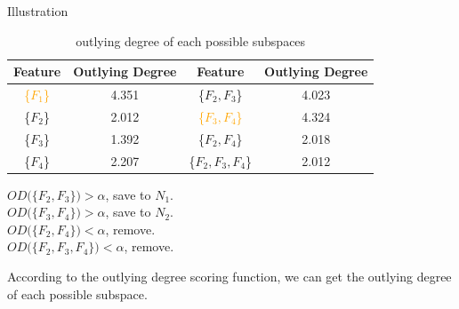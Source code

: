 \documentclass[
 size=14pt,
 paper=smartboard,  %
 mode=present, 		%
 display=slides, 	%
 style=tuliplab,  	%
 pauseslide,
 fleqn,leqno]{powerdot}
\begin{document}
\begin{slide}[toc=,bm=]{Illustration}

\setlength{\abovecaptionskip}{0pt}
\setlength{\belowcaptionskip}{10pt}
\centering
\begin{table}
\caption{outlying degree of each possible subspaces}

\begin{tabular}{c|c|c|c}
  \toprule
  Feature & Outlying Degree & Feature & Outlying Degree \\
  \midrule
  \textcolor{orange}{\{$F_1$\}}  & 4.351  & \{$F_2, F_3$\}  & 4.023 \\
  \{$F_2$\}  & 2.012                      & \textcolor{orange}{\{$F_3, F_4$\}} & 4.324 \\
  \{$F_3$\}  & 1.392                      & \{$F_2, F_4$\} & 2.018 \\
  \{$F_4$\}  & 2.207                      & \{$F_2, F_3, F_4$\} & 2.012 \\
  \bottomrule
\end{tabular}
\end{table}

\bigskip

{
\vspace{.75cm}
$OD(\{$$F_2, F_3$$\}) > \alpha$, save to $N_1$. \\
$OD(\{$$F_3, F_4$$\}) > \alpha$, save to $N_2$. \\
$OD(\{$$F_2, F_4$$\}) < \alpha$, remove. \\
$OD(\{$$F_2, F_3, F_4$$\}) < \alpha$, remove. \\
}

\begin{note}
According to the outlying degree scoring function,
we can get the outlying degree of each possible subspace.


\end{note}
\end{slide}
\end{document}
